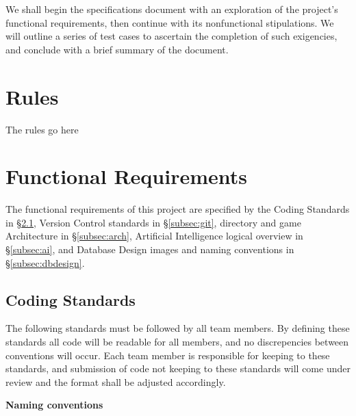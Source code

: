 \documentclass[12pt]{IEEEtran}
\begin{document}
	We shall begin the specifications document with an exploration of the project’s functional requirements, then continue with its nonfunctional stipulations. We will outline a series of test cases to ascertain the completion of such exigencies, and conclude with a brief summary of the document.

\section{Rules}
\label{sec:rules}

	The rules go here

\section{Functional Requirements}
\label{sec:funcReq}
	The functional requirements of this project are specified by the Coding Standards in \S \ref{subsec:coding}, Version 			Control standards in \S \ref{subsec:git}, directory and game Architecture in \S 	\ref{subsec:arch}, Artificial Intelligence 		logical overview in \S \ref{subsec:ai}, and Database Design images and naming conventions in \S\ref{subsec:dbdesign}.


\subsection{Coding Standards}
\label{subsec:coding}

	The following standards must be followed by all team members. By defining these standards all code will be readable for 		all members, and no discrepencies between conventions will occur. Each team member is responsible for keeping to these 	standards, and submission of code not keeping to these standards will come under review and the format shall be 			adjusted accordingly. 

	\bfseries Naming conventions \mdseries
\end{document}
